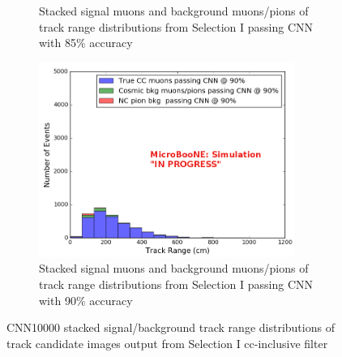 \begin{figure}[htp!]
\begin{subfigure}[b]{.45\textwidth}
	\caption{Stacked signal muons and background muons/pions of track range distributions from Selection I passing CNN with 85\% accuracy}
	\label{fig:sel1mod_mupi_85stackedcnn}
	\end{subfigure}
	\quad
	\begin{subfigure}[b]{.45\textwidth}
	\includegraphics[width=\textwidth, height=2.5in]{figs/sel1mod_cnn_trackrange_acc90_0707.png}
	\caption{Stacked signal muons and background muons/pions of track range distributions from Selection I passing CNN with 90\% accuracy}
	\label{fig:sel1mod_mupi_90stackedcnn}
	\end{subfigure}
	\quad
\caption{CNN10000 stacked signal/background track range distributions of track candidate images output from Selection I cc-inclusive filter}
\label{fig:sel1modCNNdistacc}
\end{figure}


